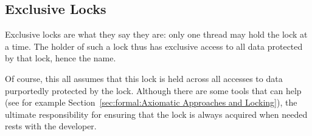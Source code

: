 \subsection{Exclusive Locks}
\label{sec:locking:Exclusive Locks}

Exclusive locks are what they say they are: only one thread may hold
the lock at a time.
The holder of such a lock thus has exclusive access to all data protected
by that lock, hence the name.

Of course, this all assumes that this lock is held across all accesses
to data purportedly protected by the lock.
Although there are some tools that can help (see for example
Section~\ref{sec:formal:Axiomatic Approaches and Locking}),
the ultimate responsibility for ensuring that the lock is always acquired
when needed rests with the developer.

